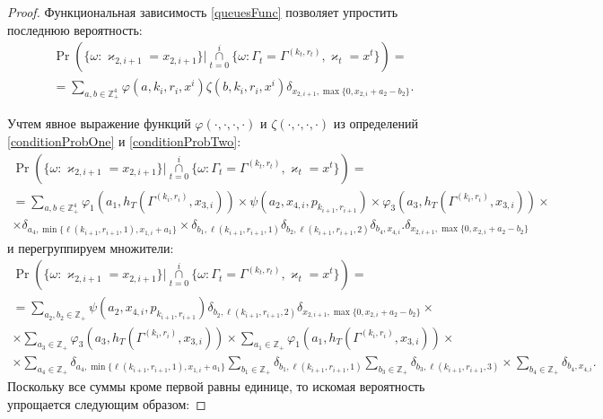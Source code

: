 \documentclass[a4paper,12pt,russian]{extarticle}
\begin{document}
\begin{proof}
Функциональная зависимость \eqref{queuesFunc} позволяет упростить последнюю вероятность:
\begin{multline*}
\Pr (\{ \omega \colon \varkappa_{2,i+1} = x_{2,i+1}\} |\mathop{\cap}\limits_{t=0}^{i}\{\omega\colon \Gamma_t=\Gamma^{(k_t,r_t)}, \varkappa_t=x^t\}) =\\
=\sum_{a,b\in \mathbb{Z}_+^4} \varphi(a,k_i,r_i,x^i)\zeta(b,k_i,r_i,x^i)  \delta_{x_{2,i+1},\max\{0,x_{2,i}+a_2-b_2\}}.
\end{multline*}

Учтем явное выражение функций $\varphi(\cdot, \cdot, \cdot, \cdot)$ и $\zeta(\cdot, \cdot, \cdot, \cdot)$ из определений \eqref{conditionProbOne} и \eqref{conditionProbTwo}:
\begin{multline*}
\Pr (\{ \omega \colon \varkappa_{2,i+1} = x_{2,i+1}\} |\mathop{\cap}\limits_{t=0}^{i}\{\omega\colon \Gamma_t=\Gamma^{(k_t,r_t)}, \varkappa_t=x^t\}) =\\
=  \sum_{a,b\in \mathbb{Z}_+^4} \varphi_1(a_1,h_T(\Gamma^{(k_i,r_i)},x_{3,i})) \times \psi(a_2,x_{4,i}, p_{k_{i+1},r_{i+1}})  \times \varphi_3(a_3,h_T(\Gamma^{(k_i,r_i)},x_{3,i})) \times \\ \times \delta_{a_4,\min{\{\ell(k_{i+1},r_{i+1},1), x_{1,i}+a_1}\}} \times \delta_{b_1,\ell(k_{i+1},r_{i+1},1)} \delta_{b_2,\ell(k_{i+1},r_{i+1},2)} 
\delta_{b_4,x_{4,i}}. \delta_{x_{2,i+1},\max\{0,x_{2,i}+a_2-b_2\}} 
\end{multline*}
и перегруппируем множители:
\begin{multline*}
\Pr (\{ \omega \colon \varkappa_{2,i+1} = x_{2,i+1}\} |\mathop{\cap}\limits_{t=0}^{i}\{\omega\colon \Gamma_t=\Gamma^{(k_t,r_t)}, \varkappa_t=x^t\}) =\\
= \sum_{a_2,b_2\in \mathbb{Z}_+}\psi(a_2,x_{4,i}, p_{k_{i+1},r_{i+1}})  \delta_{b_2,\ell(k_{i+1},r_{i+1},2)}   \delta_{x_{2,i+1},\max\{0,x_{2,i}+a_2-b_2\}} \times \\ 
\times \sum_{a_3\in \mathbb{Z}_+} \varphi_3(a_3,h_T(\Gamma^{(k_i,r_i)},x_{3,i})) \times \sum_{a_1\in \mathbb{Z}_+} \varphi_1(a_1,h_T(\Gamma^{(k_i,r_i)},x_{3,i})) \times \\ 
\times \sum_{a_4\in \mathbb{Z}_+} \delta_{a_4,\min{\{\ell(k_{i+1},r_{i+1},1), x_{1,i}+a_1}\}} \sum_{b_1\in \mathbb{Z}_+} \delta_{b_1,\ell(k_{i+1},r_{i+1},1)} \sum_{b_3\in \mathbb{Z}_+} \delta_{b_3,\ell(k_{i+1},r_{i+1},3)} 
\times \sum_{b_4\in \mathbb{Z}_+}  \delta_{b_4,x_{4,i}}.
\end{multline*}
Поскольку все суммы кроме первой равны единице, то искомая вероятность упрощается следующим образом:

\end{proof}
\end{document}
